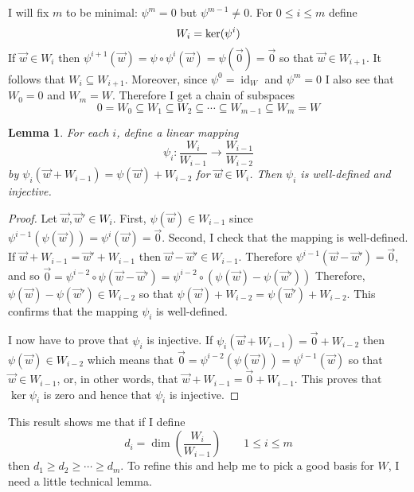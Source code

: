 \documentclass[11pt]{amsbook}
\DeclareMathOperator{\id}{\mathrm{id}}
\newtheorem{lemma}[theorem]{Lemma}
\theoremstyle{definition}
\begin{document}
I will fix $m$ to be minimal:  $\psi^m = 0$ but $\psi^{m-1} \neq 0$. For $0 \leqslant i \leqslant m$ define $$W_i = {\rm ker} (\psi^i)$$ If $\vec{w}\in W_i$ then $\psi^{i+1}(\vec{w}) = \psi\circ \psi^i(\vec{w}) = \psi(\vec{0}) = \vec{0}$ so that $\vec{w}\in W_{i+1}$. It follows that $W_i \subseteq W_{i+1}$. Moreover, since $\psi^0 = \id_W$ and $\psi^m = 0$ I also see that $W_0 =  0$ and $W_m = W$. Therefore I get a chain of subspaces $$0 = W_0 \subseteq W_1 \subseteq W_2 \subseteq \cdots \subseteq W_{m-1} \subseteq W_m = W$$

\begin{lemma} \label{tech0} For each $i$, define a linear mapping $$\psi_i : \frac{W_i}{W_{i-1}} \to \frac{W_{i-1}}{W_{i-2}}$$ by $\psi_i ( \vec{w} + W_{i-1}) = \psi(\vec{w}) + W_{i-2}$ for $\vec{w} \in W_i$. Then $\psi_i$ is well-defined and injective.
\end{lemma}
\begin{proof}
Let $\vec{w}, \vec{w}'\in W_i$. First, $\psi(\vec{w}) \in W_{i-1}$ since $\psi^{i-1}(\psi(\vec{w})) = \psi^i (\vec{w}) = \vec{0}$. Second, I check that the mapping is well-defined. If $\vec{w} + W_{i-1} = \vec{w}' + W_{i-1}$ then $\vec{w} - \vec{w}' \in W_{i-1}$. Therefore $\psi^{i-1}(\vec{w}- \vec{w}') = \vec{0}$, and so $\vec{0} = \psi^{i-2} \circ \psi(\vec{w} - \vec{w}') = \psi^{i-2}\circ( \psi(\vec{w}) - \psi(\vec{w}'))$ Therefore, $\psi(\vec{w})  - \psi(\vec{w}') \in W_{i-2}$ so that $\psi(\vec{w}) + W_{i-2} = \psi(\vec{w}') + W_{i-2}$. This confirms that the mapping $\psi_i$ is well-defined.

I now have to prove that $\psi_i$ is injective. If $\psi_i (\vec{w} + W_{i-1}) = \vec{0} + W_{i-2}$ then $\psi(\vec{w}) \in W_{i-2}$ which means that $\vec{0} = \psi^{i-2}(\psi(\vec{w})) = \psi^{i-1}(\vec{w})$ so that $\vec{w} \in W_{i-1}$, or, in other words, that $\vec{w} + W_{i-1} = \vec{0} + W_{i-1}$. This proves that $\ker \psi_i$ is zero and hence that $\psi_i$ is injective.
\end{proof}

This result shows me that if I define $$d_i = \dim \left(\frac{W_i}{W_{i-1}} \right) \qquad 1\leqslant i \leqslant m$$ then $d_1 \geqslant d_{2} \geqslant \cdots \geqslant d_m.$ To refine this and help me to pick a good basis for $W$, I need a little technical lemma.
\end{document}
